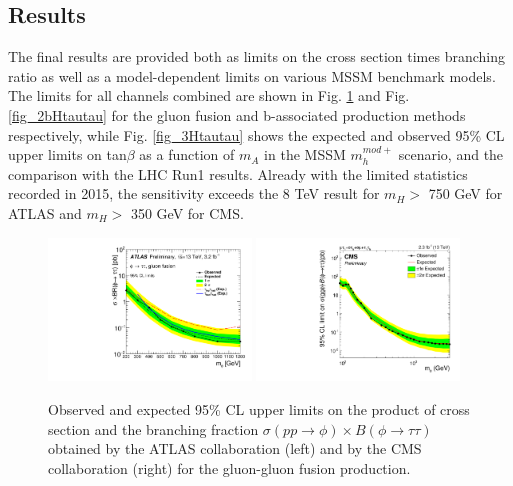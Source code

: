 \subsection{Results}
The final results are provided both as limits on the cross section times branching ratio as well
as a model-dependent limits on various MSSM benchmark models. The limits for all channels combined are shown in Fig. \ref{fig_2aHtautau} and Fig. \ref{fig_2bHtautau}
for the gluon fusion and b-associated production methods respectively, while Fig. \ref{fig_3Htautau} shows the expected and observed 95\% CL upper limits on tan$\beta$ as a function of $m_{A}$ in the MSSM $m_{h}^{mod+}$ scenario, and the comparison with the LHC Run1 results. Already with the  limited statistics recorded in 2015, the sensitivity exceeds the 8 TeV result for $m_{H} >$ 750 GeV for ATLAS and  $m_{H} >$ 350 GeV for CMS. 

\begin{figure}
\centering
\includegraphics[width=0.48\textwidth, angle=0] {figures/fig_2Htautau_a.pdf}
\includegraphics[width=0.48\textwidth, angle=0] {figures/fig_2Htautau_c.pdf}
\caption{ Observed and expected 95\% CL upper limits on the product of cross section and the branching fraction $\sigma(pp\rightarrow \phi) \times B(\phi\rightarrow \tau\tau)$ obtained by the ATLAS collaboration (left) and by the CMS collaboration (right) for the gluon-gluon fusion production.}
\label{fig_2aHtautau}   
\end{figure}

